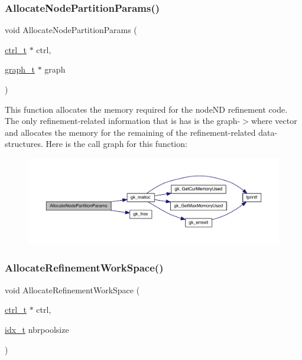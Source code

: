 \subsubsection{\texorpdfstring{Allocate\+Node\+Partition\+Params()}{AllocateNodePartitionParams()}}
{\footnotesize\ttfamily void Allocate\+Node\+Partition\+Params (\begin{DoxyParamCaption}\item[{\hyperlink{a00742}{ctrl\+\_\+t} $\ast$}]{ctrl,  }\item[{\hyperlink{a00734}{graph\+\_\+t} $\ast$}]{graph }\end{DoxyParamCaption})}

This function allocates the memory required for the node\+ND refinement code. The only refinement-\/related information that is has is the {\ttfamily graph-\/$>$where} vector and allocates the memory for the remaining of the refinement-\/related data-\/structures. Here is the call graph for this function\+:\nopagebreak
\begin{figure}[H]
\begin{center}
\leavevmode
\includegraphics[width=350pt]{a00951_afedcf14063f4d8678a3746a1152dd71c_cgraph}
\end{center}
\end{figure}
\mbox{\label{a00951_a2b337cc68be55b7e8b6d2218fcea855d}} 
\subsubsection{\texorpdfstring{Allocate\+Refinement\+Work\+Space()}{AllocateRefinementWorkSpace()}}
{\footnotesize\ttfamily void Allocate\+Refinement\+Work\+Space (\begin{DoxyParamCaption}\item[{\hyperlink{a00742}{ctrl\+\_\+t} $\ast$}]{ctrl,  }\item[{\hyperlink{a00876_aaa5262be3e700770163401acb0150f52}{idx\+\_\+t}}]{nbrpoolsize }\end{DoxyParamCaption})}

